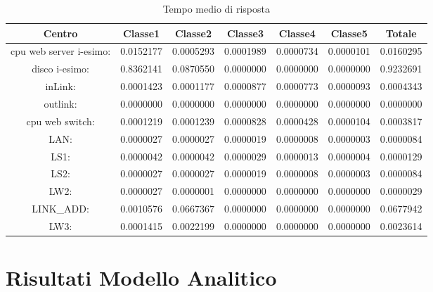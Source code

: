 \begin{table}[H]
\begin{center}\begin{scriptsize}
\begin{tabular}{||c|c|c|c|c|c|c||}
\hline
Centro &Classe1 &Classe2 &Classe3 &Classe4 &Classe5 &Totale\\
\hline
\hline
 cpu web server i-esimo: 	&0.0152177	&0.0005293	&0.0001989	&0.0000734	&0.0000101	&0.0160295\\
\hline
 disco i-esimo: 	&0.8362141	&0.0870550	&0.0000000	&0.0000000	&0.0000000	&0.9232691\\
\hline
 inLink: 	&0.0001423	&0.0001177	&0.0000877	&0.0000773	&0.0000093	&0.0004343\\
\hline
 outlink: 	&0.0000000	&0.0000000	&0.0000000	&0.0000000	&0.0000000	&0.0000000\\
\hline
 cpu web switch: 	&0.0001219	&0.0001239	&0.0000828	&0.0000428	&0.0000104	&0.0003817\\
\hline
 LAN: 	&0.0000027	&0.0000027	&0.0000019	&0.0000008	&0.0000003	&0.0000084\\
\hline
 LS1: 	&0.0000042	&0.0000042	&0.0000029	&0.0000013	&0.0000004	&0.0000129\\
\hline
 LS2: 	&0.0000027	&0.0000027	&0.0000019	&0.0000008	&0.0000003	&0.0000084\\
\hline
 LW2: 	&0.0000027	&0.0000001	&0.0000000	&0.0000000	&0.0000000	&0.0000029\\
\hline
 LINK\_ADD: 	&0.0010576	&0.0667367	&0.0000000	&0.0000000	&0.0000000	&0.0677942\\
\hline
 LW3: 	&0.0001415	&0.0022199	&0.0000000	&0.0000000	&0.0000000	&0.0023614\\
\hline
\end{tabular}
\end{scriptsize}\end{center}
\caption{Tempo medio di risposta}
\label{tempomediodirisposta}
\end{table}

\section{Risultati Modello Analitico}
